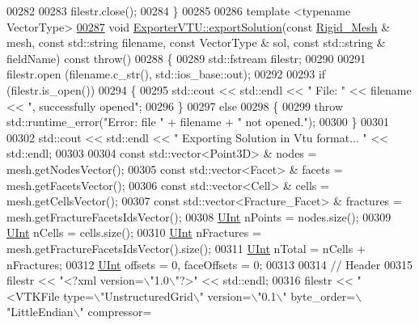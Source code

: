 \begin{DoxyCode}
00282 
00283     filestr.close();
00284 \}
00285 
00286 \textcolor{keyword}{template} <\textcolor{keyword}{typename} VectorType>
\hypertarget{ExportVTU_8hpp_source.tex_l00287}{}\hyperlink{classFVCode3D_1_1ExporterVTU_a476a1dd02bcba8c31f0d99c7106d0c21}{00287} \textcolor{keywordtype}{void} \hyperlink{classFVCode3D_1_1ExporterVTU_a476a1dd02bcba8c31f0d99c7106d0c21}{ExporterVTU::exportSolution}(\textcolor{keyword}{const} \hyperlink{classFVCode3D_1_1Rigid__Mesh}{Rigid\_Mesh} & mesh, \textcolor{keyword}{const} 
      std::string filename, \textcolor{keyword}{const} VectorType & sol, \textcolor{keyword}{const} std::string & fieldName) \textcolor{keyword}{const} \textcolor{keywordflow}{throw}()
00288 \{
00289     std::fstream filestr;
00290 
00291     filestr.open (filename.c\_str(), std::ios\_base::out);
00292 
00293     \textcolor{keywordflow}{if} (filestr.is\_open())
00294     \{
00295         std::cout << std::endl << \textcolor{stringliteral}{" File: "} << filename << \textcolor{stringliteral}{", successfully opened"};
00296     \}
00297     \textcolor{keywordflow}{else}
00298     \{
00299         \textcolor{keywordflow}{throw} std::runtime\_error(\textcolor{stringliteral}{"Error: file "} + filename + \textcolor{stringliteral}{" not opened."});
00300     \}
00301 
00302     std::cout << std::endl << \textcolor{stringliteral}{" Exporting Solution in Vtu format... "} << std::endl;
00303 
00304     \textcolor{keyword}{const} std::vector<Point3D> & nodes = mesh.getNodesVector();
00305     \textcolor{keyword}{const} std::vector<Facet> & facets = mesh.getFacetsVector();
00306     \textcolor{keyword}{const} std::vector<Cell> & cells = mesh.getCellsVector();
00307     \textcolor{keyword}{const} std::vector<Fracture\_Facet> & fractures = mesh.getFractureFacetsIdsVector();
00308     \hyperlink{namespaceFVCode3D_a4bf7e328c75d0fd504050d040ebe9eda}{UInt} nPoints = nodes.size();
00309     \hyperlink{namespaceFVCode3D_a4bf7e328c75d0fd504050d040ebe9eda}{UInt} nCells = cells.size();
00310     \hyperlink{namespaceFVCode3D_a4bf7e328c75d0fd504050d040ebe9eda}{UInt} nFractures = mesh.getFractureFacetsIdsVector().size();
00311     \hyperlink{namespaceFVCode3D_a4bf7e328c75d0fd504050d040ebe9eda}{UInt} nTotal = nCells + nFractures;
00312     \hyperlink{namespaceFVCode3D_a4bf7e328c75d0fd504050d040ebe9eda}{UInt} offsets = 0, faceOffsets = 0;
00313 
00314     \textcolor{comment}{// Header}
00315     filestr << \textcolor{stringliteral}{"<?xml version=\(\backslash\)"1.0\(\backslash\)"?>"} << std::endl;
00316     filestr << \textcolor{stringliteral}{"<VTKFile type=\(\backslash\)"UnstructuredGrid\(\backslash\)" version=\(\backslash\)"0.1\(\backslash\)" byte\_order=\(\backslash\)"LittleEndian\(\backslash\)" compressor=
}
\end{DoxyCode}
